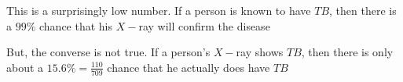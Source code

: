 \documentclass[14pt,fleqn]{extarticle}
\newcommand\xray{$X-$ray }
\begin{document}
\begin{question}
\begin{step}
This is a surprisingly low number. If a person is known to have $TB$, then there is a $99\%$ chance that his \xray will confirm the disease \newline 

But, the converse is not true. If a person's \xray shows $TB$, then there is only about a $15.6\% = \frac{110}{709}$ chance that he actually does have $TB$
\end{step}
\end{question}
\end{document}
